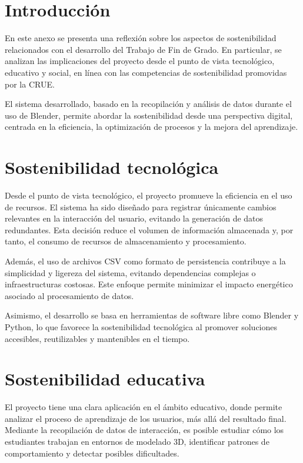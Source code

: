
\section{Introducción}

En este anexo se presenta una reflexión sobre los aspectos de sostenibilidad relacionados con el desarrollo del Trabajo de Fin de Grado. En particular, se analizan las implicaciones del proyecto desde el punto de vista tecnológico, educativo y social, en línea con las competencias de sostenibilidad promovidas por la CRUE.

El sistema desarrollado, basado en la recopilación y análisis de datos durante el uso de Blender, permite abordar la sostenibilidad desde una perspectiva digital, centrada en la eficiencia, la optimización de procesos y la mejora del aprendizaje.

\section{Sostenibilidad tecnológica}

Desde el punto de vista tecnológico, el proyecto promueve la eficiencia en el uso de recursos. El sistema ha sido diseñado para registrar únicamente cambios relevantes en la interacción del usuario, evitando la generación de datos redundantes. Esta decisión reduce el volumen de información almacenada y, por tanto, el consumo de recursos de almacenamiento y procesamiento.

Además, el uso de archivos CSV como formato de persistencia contribuye a la simplicidad y ligereza del sistema, evitando dependencias complejas o infraestructuras costosas. Este enfoque permite minimizar el impacto energético asociado al procesamiento de datos.

Asimismo, el desarrollo se basa en herramientas de software libre como Blender y Python, lo que favorece la sostenibilidad tecnológica al promover soluciones accesibles, reutilizables y mantenibles en el tiempo.

\section{Sostenibilidad educativa}

El proyecto tiene una clara aplicación en el ámbito educativo, donde permite analizar el proceso de aprendizaje de los usuarios, más allá del resultado final. Mediante la recopilación de datos de interacción, es posible estudiar cómo los estudiantes trabajan en entornos de modelado 3D, identificar patrones de comportamiento y detectar posibles dificultades.

